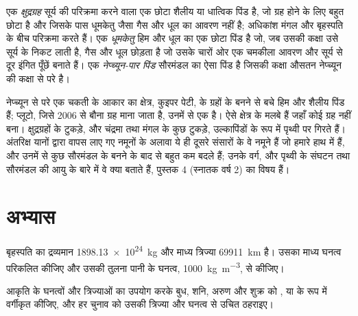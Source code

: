 \begin{definition}[क्षुद्रग्रह, धूमकेतु, नेप्च्यून-पार पिंड]\label{def:b1:comparative-planetology:small-bodies}
एक \emph{क्षुद्रग्रह} सूर्य की परिक्रमा करने वाला एक छोटा शैलीय या धात्विक पिंड है,
जो ग्रह होने के लिए बहुत छोटा है और जिसके पास धूमकेतु जैसा गैस और धूल का आवरण नहीं है; अधिकांश
मंगल और बृहस्पति के बीच परिक्रमा करते हैं। एक \emph{धूमकेतु} हिम और धूल का एक छोटा
पिंड है जो, जब उसकी कक्षा उसे सूर्य के निकट लाती है, गैस और धूल छोड़ता है जो उसके चारों ओर एक
चमकीला आवरण और सूर्य से दूर इंगित पूँछें बनाते हैं। एक \emph{नेप्च्यून-पार पिंड}
सौरमंडल का ऐसा पिंड है जिसकी कक्षा औसतन नेप्च्यून की कक्षा से परे है।
\end{definition}

नेप्च्यून से परे एक चकती के आकार का क्षेत्र, कुइपर पेटी, के  ग्रहों के बनने से बचे
हिम और शैलीय पिंड हैं; प्लूटो, जिसे 2006 से बौना ग्रह माना जाता है, उनमें से एक है। 
ऐसे क्षेत्र के मलबे हैं जहाँ कोई ग्रह नहीं बना। क्षुद्रग्रहों के टुकड़े, और चंद्रमा तथा मंगल के कुछ
टुकड़े, उल्कापिंडों के रूप में पृथ्वी पर गिरते हैं। अंतरिक्ष यानों द्वारा वापस लाए गए नमूनों के
अलावा ये ही दूसरे संसारों के वे नमूने हैं जो हमारे हाथ में हैं, और उनमें से कुछ सौरमंडल के बनने
के बाद से बहुत कम बदले हैं; उनके वर्ग, और पृथ्वी के संघटन तथा सौरमंडल की आयु के बारे में वे क्या
बताते हैं, पुस्तक 4 (स्नातक वर्ष 2) का विषय हैं।

\section{अभ्यास}

\begin{exercise}[$\star$]\label{exo:b1:comparative-planetology:1}
बृहस्पति का द्रव्यमान \qty{1898.13e24}{kg} और माध्य त्रिज्या \qty{69911}{km} है। उसका माध्य घनत्व
परिकलित कीजिए और उसकी तुलना पानी के घनत्व, \qty{1000}{kg.m^{-3}}, से कीजिए।
\end{exercise}

\begin{exercise}[$\star$]\label{exo:b1:comparative-planetology:2}
आकृति के घनत्वों और त्रिज्याओं का उपयोग करके बुध, शनि, अरुण और शुक्र को ,  या
 के रूप में वर्गीकृत कीजिए, और हर चुनाव को उसकी त्रिज्या और घनत्व से उचित ठहराइए।
\end{exercise}

